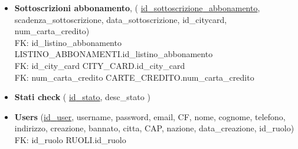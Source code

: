 \begin{itemize}
    \item 
    \textbf{Sottoscrizioni abbonamento},
    (
    \underline{id{\_}sottoscrizione{\_}abbonamento},
    scadenza{\_}sottoscrizione,
    data{\_}sottoscrizione,
    id{\_}citycard,
    num{\_}carta{\_}credito)\\
    FK: id{\_}listino{\_}abbonamento \textrightarrow LISTINO{\_}ABBONAMENTI.id{\_}listino{\_}abbonamento\\
    FK: id{\_}city{\_}card \textrightarrow CITY{\_}CARD.id{\_}city{\_}card\\
    FK: num{\_}carta{\_}credito \textrightarrow CARTE{\_}CREDITO.num{\_}carta{\_}credito
    
    \item 
    \textbf{Stati check}
    (
    \underline{id{\_}stato},
    desc{\_}stato
    )
    \item 
    \textbf{Users}
    (\underline{id{\_}user},
    username,
    password,
    email,
    CF,
    nome,
    cognome,
    telefono,
    indirizzo,
    creazione,
    bannato,
    citta,
    CAP,
    nazione,
    data{\_}creazione,
    id{\_}ruolo)\\
    FK: id{\_}ruolo \textrightarrow RUOLI.id{\_}ruolo
    
\end{itemize}


